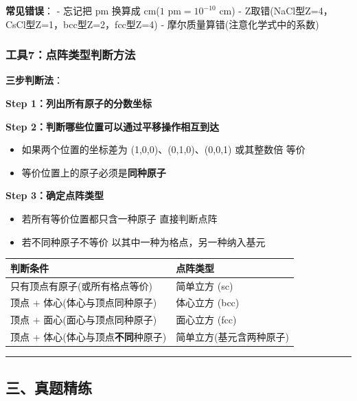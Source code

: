 \textbf{常见错误}：
- 忘记把 pm 换算成 cm(\(1 \text{ pm} = 10^{-10} \text{ cm}\))
- Z取错(NaCl型Z=4，CsCl型Z=1，bcc型Z=2，fcc型Z=4)
- 摩尔质量算错(注意化学式中的系数)

\subsubsection{工具7：点阵类型判断方法}\label{ux5de5ux51777ux70b9ux9635ux7c7bux578bux5224ux65adux65b9ux6cd5}

\textbf{三步判断法}：

\textbf{Step 1：列出所有原子的分数坐标}

\textbf{Step 2：判断哪些位置可以通过平移操作相互到达}

\begin{itemize}
\tightlist
\item
  如果两个位置的坐标差为 (1,0,0)、(0,1,0)、(0,0,1) 或其整数倍 \箭 等价
\item
  等价位置上的原子必须是\textbf{同种原子}
\end{itemize}

\textbf{Step 3：确定点阵类型}

\begin{itemize}
\tightlist
\item
  若所有等价位置都只含一种原子 \箭 直接判断点阵
\item
  若不同种原子不等价 \箭 以其中一种为格点，另一种纳入基元
\end{itemize}

{\def\LTcaptype{none} %
\begin{longtable}[]{@{}ll@{}}
\toprule\noalign{}
判断条件 & 点阵类型 \\
\midrule\noalign{}
\endhead
\bottomrule\noalign{}
\endlastfoot
只有顶点有原子(或所有格点等价) & 简单立方 (sc) \\
顶点 + 体心(体心与顶点同种原子) & 体心立方 (bcc) \\
顶点 + 面心(面心与顶点同种原子) & 面心立方 (fcc) \\
顶点 + 体心(体心与顶点\textbf{不同}种原子) & 简单立方(基元含两种原子) \\
\end{longtable}
}

\begin{center}\rule{0.5\linewidth}{0.5pt}\end{center}

\subsection{三、真题精练}\label{ux4e09ux771fux9898ux7cbeux7ec3-2}

